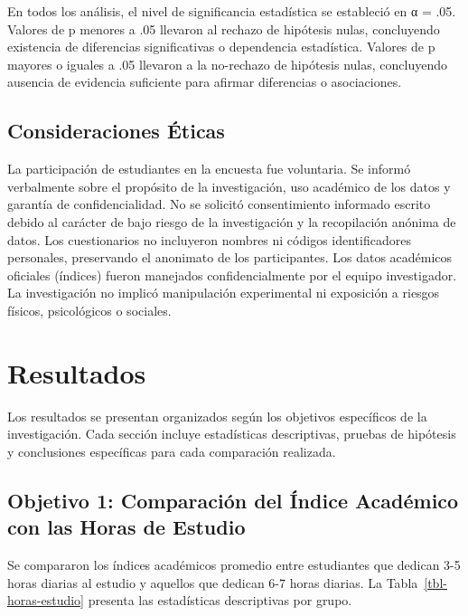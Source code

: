 \documentclass[
  stu,
  floatsintext,
  longtable,
  a4paper,
  nolmodern,
  notxfonts,
  notimes,
  12pt,
  colorlinks=true,linkcolor=blue,citecolor=blue,urlcolor=blue]{apa7}
\begin{document}
En todos los análisis, el nivel de significancia estadística se
estableció en α = .05. Valores de p menores a .05 llevaron al rechazo de
hipótesis nulas, concluyendo existencia de diferencias significativas o
dependencia estadística. Valores de p mayores o iguales a .05 llevaron a
la no-rechazo de hipótesis nulas, concluyendo ausencia de evidencia
suficiente para afirmar diferencias o asociaciones.

\subsection{Consideraciones Éticas}\label{consideraciones-uxe9ticas}

La participación de estudiantes en la encuesta fue voluntaria. Se
informó verbalmente sobre el propósito de la investigación, uso
académico de los datos y garantía de confidencialidad. No se solicitó
consentimiento informado escrito debido al carácter de bajo riesgo de la
investigación y la recopilación anónima de datos. Los cuestionarios no
incluyeron nombres ni códigos identificadores personales, preservando el
anonimato de los participantes. Los datos académicos oficiales (índices)
fueron manejados confidencialmente por el equipo investigador. La
investigación no implicó manipulación experimental ni exposición a
riesgos físicos, psicológicos o sociales.

\section{Resultados}\label{resultados}

Los resultados se presentan organizados según los objetivos específicos
de la investigación. Cada sección incluye estadísticas descriptivas,
pruebas de hipótesis y conclusiones específicas para cada comparación
realizada.

\subsection{Objetivo 1: Comparación del Índice Académico con las Horas
de
Estudio}\label{objetivo-1-comparaciuxf3n-del-uxedndice-acaduxe9mico-con-las-horas-de-estudio}

Se compararon los índices académicos promedio entre estudiantes que
dedican 3-5 horas diarias al estudio y aquellos que dedican 6-7 horas
diarias. La Tabla~\ref{tbl-horas-estudio} presenta las estadísticas
descriptivas por grupo.

\begin{table}

{\caption{{Estadísticas Descriptivas del Índice Académico según Horas de
Estudio}{\label{tbl-horas-estudio}}}}

\end{table}
\end{document}
